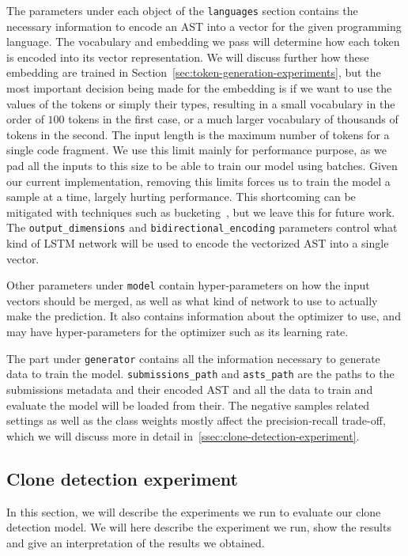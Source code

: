 The parameters under each object of the \lstinline{languages} section contains
the necessary information to encode an AST into a vector for the given
programming language. The vocabulary and embedding we pass will determine how
each token is encoded into its vector representation. We will discuss further
how these embedding are trained in
Section~\ref{sec:token-generation-experiments}, but the most important decision
being made for the embedding is if we want to use the values of the tokens or
simply their types, resulting in a small vocabulary in the order of $100$ tokens
in the first case, or a much larger vocabulary of thousands of tokens in the
second. The input length is the maximum number of tokens for a single code
fragment. We use this limit mainly for performance purpose, as we pad all the
inputs to this size to be able to train our model using batches. Given our
current implementation, removing this limits forces us to train the model a
sample at a time, largely hurting performance. This shortcoming can be mitigated
with techniques such as bucketing~\cite{DBLP:journals/corr/abs-1708-05604}, but
we leave this for future work. The \lstinline{output_dimensions} and
\lstinline{bidirectional_encoding} parameters control what kind of LSTM network
will be used to encode the vectorized AST into a single vector.

Other parameters under \lstinline{model} contain hyper-parameters on how the
input vectors should be merged, as well as what kind of network to use to
actually make the prediction. It also contains information about the optimizer
to use, and may have hyper-parameters for the optimizer such as its learning
rate.

The part under \lstinline{generator} contains all the information necessary to
generate data to train the model. \lstinline{submissions_path} and
\lstinline{asts_path} are the paths to the submissions metadata and their
encoded AST and all the data to train and evaluate the model will be loaded from
their. The negative samples related settings as well as the class weights mostly
affect the precision-recall trade-off, which we will discuss more in detail
in~\ref{ssec:clone-detection-experiment}.
\subsection{\label{ssec:clone-detection-experiment}Clone detection experiment}
In this section, we will describe the experiments we run to evaluate our clone
detection model.
We will here describe the experiment we run, show the results and give an
interpretation of the results we obtained.


